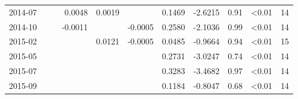 \begin{table}
\begin{tabular}[t]{lrrrrrrrrlr}
2014-07 &  &  & 0.0048 & 0.0019 &  & 0.1469 & -2.6215 & 0.91 & \textless0.01 & 14\\
2014-10 &  &  & -0.0011 &  & -0.0005 & 0.2580 & -2.1036 & 0.99 & \textless0.01 & 14\\
2015-02 &  &  &  & 0.0121 & -0.0005 & 0.0485 & -0.9664 & 0.94 & \textless0.01 & 15\\
2015-05 &  &  &  &  &  & 0.2731 & -3.0247 & 0.74 & \textless0.01 & 14\\
2015-07 &  &  &  &  &  & 0.3283 & -3.4682 & 0.97 & \textless0.01 & 14\\
2015-09 &  &  &  &  &  & 0.1184 & -0.8047 & 0.68 & \textless0.01 & 14\\
\hline
\end{tabular}
\end{table}
